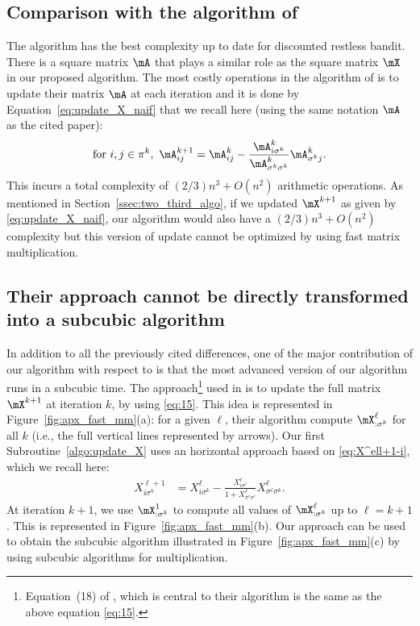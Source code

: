 \subsection{Comparison with the algorithm of \texorpdfstring{\cite{nino2020fast}}{Nino Mora 2020}}
The algorithm \cite{nino2020fast} has the best complexity up to date for discounted restless bandit. There is a square matrix $\mA$ that plays a similar role as the square matrix $\mX$ in our proposed algorithm. The most costly operations in the algorithm of \cite{nino2020fast} is to update their matrix $\mA$ at each iteration and it is done by Equation~\eqref{eq:update_X_naif} that we recall here (using the same notation $\mA$ as the cited paper):
\begin{align}
    \label{eq:15}
    \text{for } i,j\in\pi^k,\ \mA^{k+1}_{ij}= \mA^{k}_{ij} -\frac{\mA^{k}_{i\sigma^k}}{\mA^{k}_{\sigma^k\sigma^k}}\mA^{k}_{\sigma^kj}.
\end{align}
This incurs a total complexity of $(2/3)n^3+O(n^2)$ arithmetic operations.
As mentioned in Section~\ref{ssec:two_third_algo}, if we updated $\mX^{k+1}$ as given by \eqref{eq:update_X_naif}, our algorithm would also have a $(2/3)n^3+O(n^2)$ complexity but this version of update cannot be optimized by using  fast matrix multiplication.

\subsection{Their approach cannot be directly transformed into a subcubic algorithm}
\label{apx:eq_15}

In addition to all the previously cited differences, one of the major contribution of our algorithm with respect to \cite{akbarzadeh2020conditions,nino2020fast} is that the most advanced version of our algorithm runs in a subcubic time. The approach\footnote{Equation~(18) of \cite{akbarzadeh2020conditions}, which is central to their algorithm is the same as the above equation \eqref{eq:15}.} used  in \cite{akbarzadeh2020conditions,nino2020fast} is to update the full matrix $\mX^{k+1}$ at iteration $k$, by using \eqref{eq:15}.  This idea is represented in Figure~\ref{fig:apx_fast_mm}(a): for a given $\ell$, their algorithm compute $\mX^\ell_{:\sigma^k}$ for all $k$ (i.e., the full vertical lines represented by arrows).  Our first Subroutine~\ref{algo:update_X} uses an horizontal approach based on \eqref{eq:X^ell+1-i}, which we recall here:
\begin{align*}
    X^{\ell+1}_{i\sigma^k} &= X^{\ell}_{i\sigma^k} - \frac{X^{\ell}_{i\sigma^\ell}}{1+X^{\ell}_{{\sigma^\ell\sigma^\ell}}} X^{\ell}_{{\sigma^\ell} \sigma^k}.
\end{align*}
At iteration $k+1$, we use $\mX^{1}_{: \sigma^k}$ to compute all values of $\mX^\ell_{:\sigma^k}$ up to $\ell=k+1$.  This is represented in Figure~\ref{fig:apx_fast_mm}(b).  Our approach can be used to obtain the subcubic algorithm illustrated in Figure~\ref{fig:apx_fast_mm}(c) by using subcubic algorithms for multiplication.


